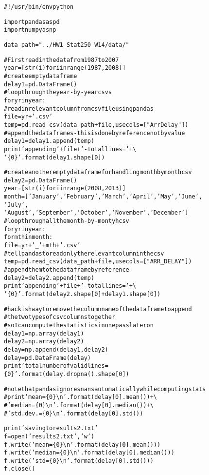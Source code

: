 \documentclass[letterpaper,10pt,english]{/usr/local/lib/python2.7/dist-packages/sphinx/texinputs/sphinxhowto}
\newenvironment{InvisibleVerbatim}
        {\begin{mdframed}[leftmargin=0.1\linewidth,innerleftmargin=3pt,innerrightmargin=3pt, userdefinedwidth=1\linewidth, linewidth=0pt, linecolor=white, usetwoside=false]}
        {\end{mdframed}}
\begin{document}
                \begin{InvisibleVerbatim}
                \vspace{-0.5\baselineskip}
\begin{alltt}\#!/usr/bin/env python

import pandas as pd
import numpy as np

data\_path = "../HW1\_Stat250\_W14/data/"

\# First read in the data from 1987 to 2007
year = [ str(i) for i in range(1987,2008) ]
\# create empty dataframe
delay1 = pd.DataFrame()
\# loop through the year-by-year csvs
for yr in year:
    \# read in relevant column from csv file using pandas
    file = yr +'.csv'
    temp = pd.read\_csv(data\_path + file, usecols=["ArrDelay"])
    \# append the dataframes - this is done by reference not by value
    delay1 = delay1.append(temp)
    print 'appending '+ file + ' - total lines = ' + \textbackslash{}
            '\{0\}'.format(delay1.shape[0])

\# create another empty dataframe for handling month by month csv
delay2 = pd.DataFrame()
year = [ str(i) for i in range(2008, 2013) ]
month = ['January','February', 'March', 'April', 'May', 'June',
'July',
         'August','September', 'October', 'November', 'December']
\# loop through all the month-by-montyh csv
for yr in year:
    for mth in month:
        file = yr + '\_' + mth + '.csv'
        \# tell pandas to read only the relevant column in the csv
        temp = pd.read\_csv(data\_path + file, usecols=["ARR\_DELAY"])
        \# append them to the dataframe by reference
        delay2 = delay2.append(temp)
        print 'appending ' + file + ' - total lines = ' + \textbackslash{}
            '\{0\}'.format(delay2.shape[0] + delay1.shape[0])

\# hackish way to remove the column name of the dataframe to append
\# the two types of csv columns together
\# so I can compute the statistics in one pass later on
delay1 = np.array(delay1)
delay2 = np.array(delay2)
delay = np.append(delay1, delay2)
delay = pd.DataFrame(delay)
print 'total number of valid lines =
\{0\}'.format(delay.dropna().shape[0])

\# note that pandas ignores nans automatically while computing stats
\#print 'mean = \{0\} \textbackslash{}n'.format(delay[0].mean()) +\textbackslash{}
\#    'median = \{0\} \textbackslash{}n'.format(delay[0].median()) +\textbackslash{}
\#    'std. dev. = \{0\}\textbackslash{}n'.format(delay[0].std())

print 'saving to results2.txt'
f = open('results2.txt', 'w')
f.write('mean = \{0\}\textbackslash{}n'.format(delay[0].mean()))
f.write('median = \{0\}\textbackslash{}n'.format(delay[0].median()))
f.write('std = \{0\}\textbackslash{}n'.format(delay[0].std()))
f.close()
\end{alltt}

            \end{InvisibleVerbatim}
            
\end{document}
